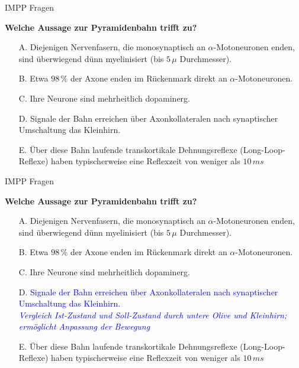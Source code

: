 \documentclass{beamer}
\begin{document}
\begin{frame}{IMPP Fragen}
    
\textbf{Welche Aussage zur Pyramidenbahn trifft zu?} \\[0.2 cm]

\begin{itemize}
\item[A.] Diejenigen Nervenfasern, die monosynaptisch an \(\alpha\)-Motoneuronen enden, sind überwiegend dünn myelinisiert (bis \(5\,\mu\) Durchmesser).
\item[B.] Etwa \(98\,\%\) der Axone enden im Rückenmark direkt an \(\alpha\)-Motoneuronen.
\item[C.] Ihre Neurone sind mehrheitlich dopaminerg.
\item[D.] Signale der Bahn erreichen über Axonkollateralen nach synaptischer Umschaltung das Kleinhirn. %
\item[E.] Über diese Bahn laufende transkortikale Dehnungsreflexe (Long-Loop-Reflexe) haben typischerweise eine Reflexzeit von weniger als \(10\,ms\)

\end{itemize}    

\end{frame}


\begin{frame}{IMPP Fragen}
    
\textbf{Welche Aussage zur Pyramidenbahn trifft zu?} \\[0.2 cm]

\begin{itemize}
\item[A.] Diejenigen Nervenfasern, die monosynaptisch an \(\alpha\)-Motoneuronen enden, sind überwiegend dünn myelinisiert (bis \(5\,\mu\) Durchmesser).
\item[B.] Etwa \(98\,\%\) der Axone enden im Rückenmark direkt an \(\alpha\)-Motoneuronen.
\item[C.] Ihre Neurone sind mehrheitlich dopaminerg.
\item[D.] \textcolor{blue}{Signale der Bahn erreichen über Axonkollateralen nach synaptischer Umschaltung das Kleinhirn.}  \\ %
\textcolor{blue}{\emph{Vergleich Ist-Zustand und Soll-Zustand durch untere Olive und Kleinhirn; ermöglicht Anpassung der Bewegung}}
\item[E.] Über diese Bahn laufende transkortikale Dehnungsreflexe (Long-Loop-Reflexe) haben typischerweise eine Reflexzeit von weniger als \(10\,ms\)

\end{itemize}    

\end{frame}
\end{document}
